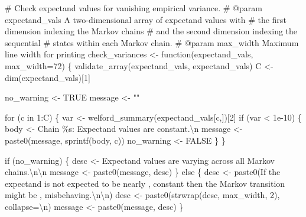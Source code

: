 \documentclass[
  letterpaper,
  DIV=11,
  numbers=noendperiod]{scrartcl}
\newenvironment{Shaded}{\begin{snugshade}}{\end{snugshade}}
\newcommand{\CharTok}[1]{\textcolor[rgb]{0.13,0.47,0.30}{#1}}
\newcommand{\CommentTok}[1]{\textcolor[rgb]{0.37,0.37,0.37}{#1}}
\newcommand{\ControlFlowTok}[1]{\textcolor[rgb]{0.00,0.23,0.31}{#1}}
\newcommand{\DecValTok}[1]{\textcolor[rgb]{0.68,0.00,0.00}{#1}}
\newcommand{\FloatTok}[1]{\textcolor[rgb]{0.68,0.00,0.00}{#1}}
\newcommand{\KeywordTok}[1]{\textcolor[rgb]{0.00,0.23,0.31}{#1}}
\newcommand{\NormalTok}[1]{\textcolor[rgb]{0.00,0.23,0.31}{#1}}
\newcommand{\OperatorTok}[1]{\textcolor[rgb]{0.37,0.37,0.37}{#1}}
\newcommand{\SpecialCharTok}[1]{\textcolor[rgb]{0.37,0.37,0.37}{#1}}
\newcommand{\StringTok}[1]{\textcolor[rgb]{0.13,0.47,0.30}{#1}}
\begin{document}
\begin{Shaded}
\begin{Highlighting}[]
\CommentTok{\# Check expectand values for vanishing empirical variance.}
\CommentTok{\# @param expectand\_vals A two{-}dimensional array of expectand values with}
\CommentTok{\#                       the first dimension indexing the Markov chains}
\CommentTok{\#                       and the second dimension indexing the sequential}
\CommentTok{\#                       states within each Markov chain.}
\CommentTok{\# @param max\_width Maximum line width for printing}
\NormalTok{check\_variances }\OperatorTok{\textless{}{-}}\NormalTok{ function(expectand\_vals, max\_width}\OperatorTok{=}\DecValTok{72}\NormalTok{) \{}
\NormalTok{  validate\_array(expectand\_vals, }\StringTok{\textquotesingle{}expectand\_vals\textquotesingle{}}\NormalTok{)}
\NormalTok{  C }\OperatorTok{\textless{}{-}}\NormalTok{ dim(expectand\_vals)[}\DecValTok{1}\NormalTok{]}
  
\NormalTok{  no\_warning }\OperatorTok{\textless{}{-}}\NormalTok{ TRUE}
\NormalTok{  message }\OperatorTok{\textless{}{-}} \StringTok{""}

  \ControlFlowTok{for}\NormalTok{ (c }\KeywordTok{in} \DecValTok{1}\NormalTok{:C) \{}
\NormalTok{    var }\OperatorTok{\textless{}{-}}\NormalTok{ welford\_summary(expectand\_vals[c,])[}\DecValTok{2}\NormalTok{]}
    \ControlFlowTok{if}\NormalTok{ (var }\OperatorTok{\textless{}} \FloatTok{1e{-}10}\NormalTok{) \{}
\NormalTok{      body }\OperatorTok{\textless{}{-}} \StringTok{\textquotesingle{}  Chain }\SpecialCharTok{\%s}\StringTok{: Expectand values are constant.}\CharTok{\textbackslash{}n}\StringTok{\textquotesingle{}}
\NormalTok{      message }\OperatorTok{\textless{}{-}}\NormalTok{ paste0(message, sprintf(body, c))}
\NormalTok{      no\_warning }\OperatorTok{\textless{}{-}}\NormalTok{ FALSE}
\NormalTok{    \}}
\NormalTok{  \}}
  
  \ControlFlowTok{if}\NormalTok{ (no\_warning) \{}
\NormalTok{    desc }\OperatorTok{\textless{}{-}} \StringTok{\textquotesingle{}Expectand values are varying across all Markov chains.}\CharTok{\textbackslash{}n\textbackslash{}n}\StringTok{\textquotesingle{}}
\NormalTok{    message }\OperatorTok{\textless{}{-}}\NormalTok{ paste0(message, desc)}
\NormalTok{  \} }\ControlFlowTok{else}\NormalTok{ \{}
\NormalTok{    desc }\OperatorTok{\textless{}{-}}\NormalTok{ paste0(}\StringTok{\textquotesingle{}If the expectand is not expected to be nearly \textquotesingle{}}\NormalTok{,}
                   \StringTok{\textquotesingle{}constant then the Markov transition might be \textquotesingle{}}\NormalTok{,}
                   \StringTok{\textquotesingle{}misbehaving.}\CharTok{\textbackslash{}n\textbackslash{}n}\StringTok{\textquotesingle{}}\NormalTok{)}
\NormalTok{    desc }\OperatorTok{\textless{}{-}}\NormalTok{ paste0(strwrap(desc, max\_width, }\DecValTok{2}\NormalTok{), collapse}\OperatorTok{=}\StringTok{\textquotesingle{}}\CharTok{\textbackslash{}n}\StringTok{\textquotesingle{}}\NormalTok{)}
\NormalTok{    message }\OperatorTok{\textless{}{-}}\NormalTok{ paste0(message, desc)}
\NormalTok{  \}}
  

\end{Highlighting}
\end{Shaded}
\end{document}
